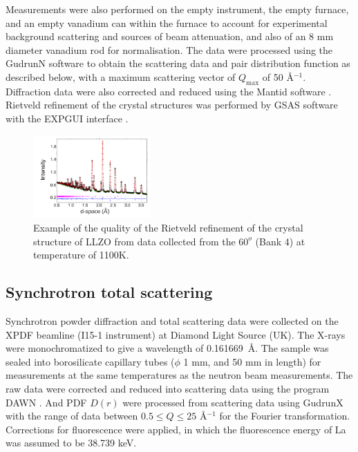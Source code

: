 \documentclass[twoside,twocolumn,9pt]{article}
\begin{document}
Measurements were also performed on the empty instrument, the empty furnace, and an empty vanadium can within the furnace to account for experimental background scattering and sources of beam attenuation, and also of an 8 mm diameter vanadium rod for normalisation. The data were processed using the GudrunN software \cite{Soper:2012vs} to obtain the scattering data and pair distribution function as described below, with a maximum scattering vector of $Q_\mathrm{max}$ of 50 \AA$^{-1}$. Diffraction data were also corrected and reduced using the Mantid software \cite{Arnold:2014iy}. Rietveld refinement of the crystal structures was performed by GSAS software \cite{Larson:2004wv} with the EXPGUI interface \cite{gsasgui}.

\begin{figure}[t]
\begin{center}
\includegraphics[width=0.4\textwidth]{Pics/1100KBank4v03.pdf}
\caption{Example of the quality of the Rietveld refinement of the crystal structure
 of LLZO from data collected from the $60^o$ (Bank 4) at temperature of 1100K.}
\label{fig:gsas}
\end{center}
\end{figure}


\subsection{Synchrotron total scattering}
Synchrotron powder diffraction and total scattering data were collected on the XPDF beamline (I15-1 instrument) at Diamond Light Source (UK).
The X-rays were monochromatized to give a wavelength of 0.161669~\AA.
The sample was sealed into borosilicate capillary tubes ($\phi$ 1 mm, and 50 mm in length) for measurements at the same temperatures as the neutron beam measurements. The raw data  were corrected and reduced into scattering data using the program DAWN \cite{Basham:2015cf}.
And PDF $D(r)$ were processed from scattering data using GudrunX \cite{Soper:2011fda,Soper:2012vs} with the range of data between $0.5 \le Q \le 25$ \AA$^{-1}$ for the Fourier transformation. Corrections for fluorescence were applied, in which the fluorescence energy of La was assumed to be 38.739 keV.
\end{document}
